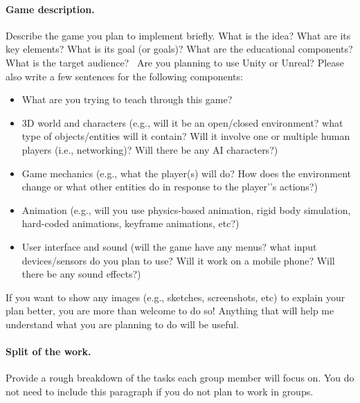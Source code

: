 \documentclass[11pt]{article}
\begin{document}
\maketitle

\paragraph*{Game description.}
Describe the game you plan to implement briefly. What is the idea? What are its key elements? What is its goal (or goals)? What are the educational components? What is the target audience?  \ Are you planning to use Unity or Unreal? Please also write a few sentences  for the following components:


\begin{itemize}
\item What are you trying to teach through this game?

\item 3D world and characters (e.g., will it be an open/closed environment? what type of objects/entities will it contain? Will it involve one or multiple human players (i.e., networking)? Will there be any AI characters?)

\item Game mechanics (e.g., what the player(s) will do? How does the environment change or what other entities do in response to the player’'s actions?)

\item Animation (e.g., will you use physics-based animation, rigid body simulation, hard-coded animations, keyframe animations, etc?)
\item User interface and sound (will the game have any menus? what input devices/sensors do you plan to use? Will it work on a mobile phone? Will there be any sound effects?)
\end{itemize}

If you want to show any images (e.g., sketches, screenshots, etc) to explain your plan better, you are more than welcome to do so! Anything that will help me understand what you are planning to do will be useful.  


\paragraph{Split of the work.}
Provide  a rough breakdown of the tasks each group member will focus on. You do not need to include this paragraph if you do not plan to work in groups. 
\end{document}
